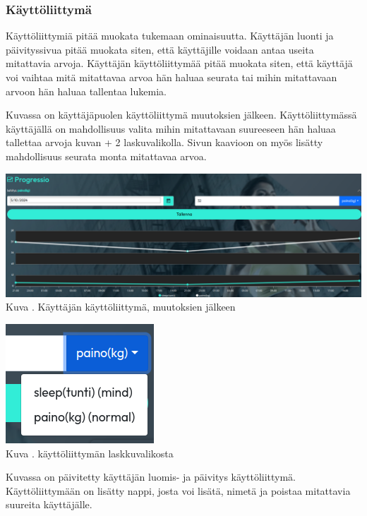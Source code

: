 \subsubsection{Käyttöliittymä}





Käyttöliittymiä pitää muokata tukemaan ominaisuutta.
Käyttäjän luonti ja päivityssivua pitää muokata siten, että käyttäjille voidaan antaa useita mitattavia arvoja.
Käyttäjän käyttöliittymää pitää muokata siten,
että käyttäjä voi vaihtaa mitä mitattavaa arvoa hän haluaa seurata tai mihin mitattavaan arvoon hän haluaa tallentaa lukemia.
\medskip

Kuvassa \nextImageCount{} on käyttäjäpuolen käyttöliittymä muutoksien jälkeen.
Käyttöliittymässä käyttäjällä on mahdollisuus valita mihin mitattavaan suureeseen hän haluaa tallettaa arvoja kuvan {\the\numexpr \theimgCounter + 2 } laskuvalikolla.
Sivun kaavioon on myös lisätty mahdollisuus seurata monta mitattavaa arvoa.
\medskip

\bigskip
\includegraphics[width = 15cm]{src/public/progressmulti.png}\\
Kuva \getImgCount {}. Käyttäjän käyttöliittymä, muutoksien jälkeen 
\medskip

\bigskip
\includegraphics{src/public/progressselect.png}\\
Kuva \getImgCount {}. käyttöliittymän laskkuvalikosta
\medskip



Kuvassa \nextImageCount {} on päivitetty käyttäjän luomis- ja päivitys käyttöliittymä.
Käyttöliittymään on lisätty nappi, josta voi lisätä, nimetä ja poistaa mitattavia suureita käyttäjälle.
%


